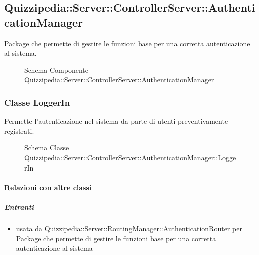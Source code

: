 \subsection{Quizzipedia::Server::ControllerServer::AuthenticationManager}
Package che permette di gestire le funzioni base per una corretta autenticazione al sistema.
\begin{figure}[H]
\centering
\noindent{}
\caption[Schema Componente Quizzipedia::Server::ControllerServer::AuthenticationManager]{Schema Componente Quizzipedia::Server::ControllerServer::AuthenticationManager}
\end{figure}
\subsubsection{Classe LoggerIn}
Permette l'autenticazione nel sistema da parte di utenti preventivamente registrati.
\begin{figure}[H]
\centering
\noindent{}
\caption[Schema Classe LoggerIn]{Schema Classe Quizzipedia::Server::ControllerServer::AuthenticationManager::LoggerIn}
\end{figure}
\paragraph{Relazioni con altre classi}
\subparagraph{Entranti}
\begin{itemize}
\item usata da Quizzipedia::Server::RoutingManager::AuthenticationRouter per Package che permette di gestire le funzioni base per una corretta autenticazione al sistema
\end{itemize}
